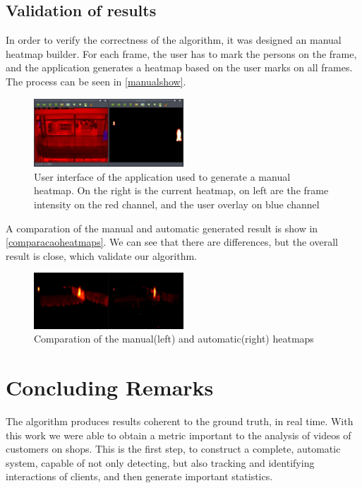 \documentclass[10pt, conference]{IEEEtran}
\begin{document}
	\subsection{Validation of results}
	In order to verify the correctness of the algorithm, it was designed an manual heatmap builder. For each frame, the user has to mark the persons on the frame, and the application generates a heatmap based on the user marks on all frames. The process can be seen in \autoref{manualshow}.
	\begin{figure}[H]
		\centering
		\includegraphics[width=0.5\textwidth]{figs/manualshow}
		\caption{User interface of the application used to generate a manual heatmap. On the right is the current heatmap, on left are the frame intensity on the red channel, and the user overlay on blue channel}
		\label{manualshow}
	\end{figure}
	A comparation of the manual and automatic generated result is show in \autoref{comparacaoheatmaps}. We can see that there are differences, but the overall result is close, which validate our algorithm.
	\begin{figure}[H]
		\centering
		\includegraphics[width=0.5\textwidth]{figs/comparacaoheatmaps}
		\caption{Comparation of the manual(left) and automatic(right) heatmaps}
		\label{comparacaoheatmaps}
	\end{figure}
	
	
	\section{Concluding Remarks}
	The algorithm produces results coherent to the ground truth, in real time. With this work we were able to obtain a metric important to the analysis of videos of customers on shops. This is the first step, to construct a complete, automatic system, capable of not only detecting, but also tracking and identifying interactions of clients, and then generate important statistics.
	
\end{document}
